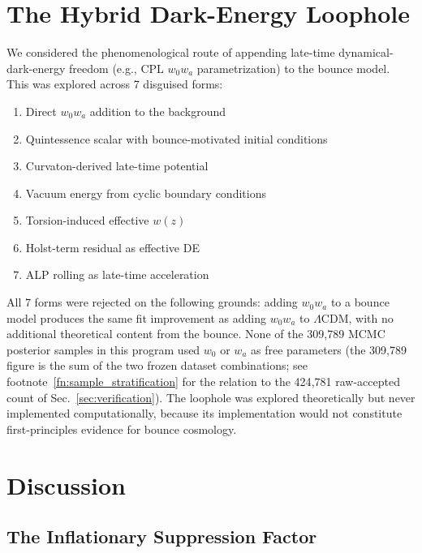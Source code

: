 \documentclass[aps,prd,twocolumn,superscriptaddress,showpacs,preprintnumbers,nofootinbib,longbibliography,floatfix]{revtex4-2}
\begin{document}
\section{The Hybrid Dark-Energy Loophole}\label{sec:loophole}

We considered the phenomenological route of appending late-time dynamical-dark-energy freedom (e.g., CPL $w_0w_a$ parametrization) to the bounce model. This was explored across 7 disguised forms:

\begin{enumerate}
\item Direct $w_0w_a$ addition to the background
\item Quintessence scalar with bounce-motivated initial conditions
\item Curvaton-derived late-time potential
\item Vacuum energy from cyclic boundary conditions
\item Torsion-induced effective $w(z)$
\item Holst-term residual as effective DE
\item ALP rolling as late-time acceleration
\end{enumerate}

All 7 forms were rejected on the following grounds: adding $w_0w_a$ to a bounce model produces the same fit improvement as adding $w_0w_a$ to $\Lambda$CDM, with no additional theoretical content from the bounce. None of the 309{,}789 MCMC posterior samples in this program used $w_0$ or $w_a$ as free parameters (the 309{,}789 figure is the sum of the two frozen dataset combinations; see footnote~\ref{fn:sample_stratification} for the relation to the 424{,}781 raw-accepted count of Sec.~\ref{sec:verification}). The loophole was explored theoretically but never implemented computationally, because its implementation would not constitute first-principles evidence for bounce cosmology.


\section{Discussion}\label{sec:discussion}

\subsection{The Inflationary Suppression Factor}\label{sec:gdp}
\end{document}
